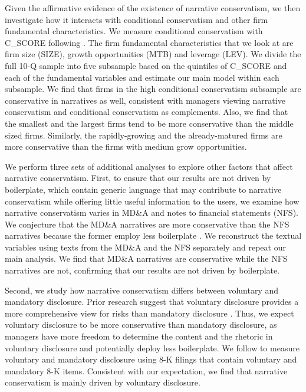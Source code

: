 \documentclass[letterpaper,11pt]{article}
\begin{document}
\begin{spacing}{1.5}
Given the affirmative evidence of the existence of narrative conservatism, we then investigate how it interacts with conditional conservatism and other firm fundamental characteristics. We measure conditional conservatism with C\_SCORE following . The firm fundamental characteristics that we look at are firm size (SIZE), growth opportunities (MTB) and leverage (LEV). We divide the full 10-Q sample into five subsample based on the quintiles of C\_SCORE and each of the fundamental variables and estimate our main model within each subsample. We find that firms in the high conditional conservatism subsample are conservative in narratives as well, consistent with managers viewing narrative conservatism and conditional conservatism as complements. Also, we find that the smallest and the largest firms tend to be more conservative than the middle sized firms. Similarly, the rapidly-growing and the already-matured firms are more conservative than the firms with medium grow opportunities.

We perform three sets of additional analyses to explore other factors that affect narrative conservatism. First, to ensure that our results are not driven by boilerplate, which contain generic language that may contribute to narrative conservatism while offering little useful information to the users, we examine how narrative conservatism varies in MD\&A and notes to financial statements (NFS). We conjecture that the MD\&A narratives are more conservative than the NFS narratives because the former employ less boilerplate \cite{secFinancialReportingManual2019}. We reconstruct the textual variables using texts from the MD\&A and the NFS separately and repeat our main analysis. We find that MD\&A narratives are conservative while the NFS narratives are not, confirming that our results are not driven by boilerplate. 

Second, we study how narrative conservatism differs between voluntary and mandatory disclosure. Prior research suggest that voluntary disclosure provides a more comprehensive view for risks than mandatory disclosure \cite{nelsonCarrotStickShift2016}. Thus, we expect voluntary disclosure to be more conservative than mandatory disclosure, as managers have more freedom to determine the content and the rhetoric in voluntary disclosure and potentially deploy less boilerplate. We follow  to measure voluntary and mandatory disclosure using 8-K filings that contain voluntary and mandatory 8-K items. Consistent with our expectation, we find that narrative conservatism is mainly driven by voluntary disclosure. 


\end{spacing}
\end{document}
